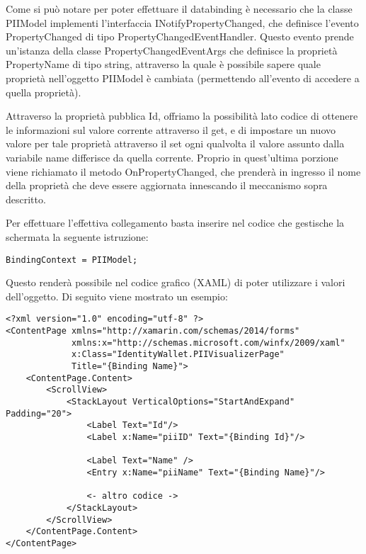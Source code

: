 Come si può notare per poter effettuare il databinding è necessario che la classe PIIModel implementi l’interfaccia INotifyPropertyChanged, che definisce l’evento PropertyChanged di tipo PropertyChangedEventHandler. Questo evento prende un’istanza della classe PropertyChangedEventArgs che definisce la proprietà PropertyName di tipo string, attraverso la quale è possibile sapere quale proprietà nell'oggetto PIIModel è cambiata (permettendo all’evento di accedere a quella proprietà).

Attraverso la proprietà pubblica Id, offriamo la possibilità lato codice di ottenere le informazioni sul valore corrente attraverso il get, e di impostare un nuovo valore per tale proprietà attraverso il set ogni qualvolta il valore assunto dalla variabile name differisce da quella corrente. Proprio in quest’ultima porzione viene richiamato il metodo OnPropertyChanged, che prenderà in ingresso il nome della proprietà che deve essere aggiornata innescando il meccanismo sopra descritto. 

Per effettuare l'effettiva collegamento basta inserire nel codice che gestische la schermata la seguente istruzione:
\begin{lstlisting}[caption={codice di connessione}]
    BindingContext = PIIModel;
\end{lstlisting}

Questo renderà possibile nel codice grafico (XAML) di poter utilizzare i valori dell'oggetto. Di seguito viene mostrato un esempio:

\begin{lstlisting}[caption={esempio di vista che usa il databinding}]
<?xml version="1.0" encoding="utf-8" ?>
<ContentPage xmlns="http://xamarin.com/schemas/2014/forms"
             xmlns:x="http://schemas.microsoft.com/winfx/2009/xaml"
             x:Class="IdentityWallet.PIIVisualizerPage"
             Title="{Binding Name}">
    <ContentPage.Content>
        <ScrollView>
            <StackLayout VerticalOptions="StartAndExpand" Padding="20">
                <Label Text="Id"/>
                <Label x:Name="piiID" Text="{Binding Id}"/>
            
                <Label Text="Name" />
                <Entry x:Name="piiName" Text="{Binding Name}"/>
            
                <- altro codice ->
            </StackLayout>
        </ScrollView>
    </ContentPage.Content>
</ContentPage>
\end{lstlisting}

